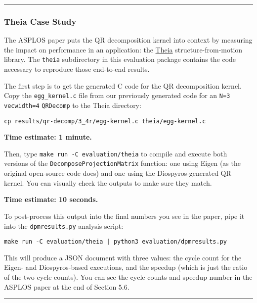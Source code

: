 \begin{center}\rule{0.5\linewidth}{0.5pt}\end{center}

\hypertarget{theia-case-study}{%
\subsubsection{Theia Case Study}\label{theia-case-study}}

The ASPLOS paper puts the QR decomposition kernel into context by
measuring the impact on performance in an application: the
\href{https://github.com/sweeneychris/TheiaSfM}{Theia}
structure-from-motion library. The \texttt{theia} subdirectory in this
evaluation package contains the code necessary to reproduce those
end-to-end results.

The first step is to get the generated C code for the QR decomposition
kernel. Copy the \texttt{egg\_kernel.c} file from our previously
generated code for an \texttt{N=3} \texttt{vecwidth=4} \texttt{QRDecomp}
to the Theia directory:

\begin{verbatim}
cp results/qr-decomp/3_4r/egg-kernel.c theia/egg-kernel.c
\end{verbatim}

\textbf{Time estimate: 1 minute.}

Then, type \texttt{make\ run\ -C\ evaluation/theia} to compile and
execute both versions of the \texttt{DecomposeProjectionMatrix}
function: one using Eigen (as the original open-source code does) and
one using the Diospyros-generated QR kernel. You can visually check the
outputs to make sure they match.

\textbf{Time estimate: 10 seconds.}

To post-process this output into the final numbers you see in the paper,
pipe it into the \texttt{dpmresults.py} analysis script:

\begin{verbatim}
make run -C evaluation/theia | python3 evaluation/dpmresults.py
\end{verbatim}

This will produce a JSON document with three values: the cycle count for
the Eigen- and Diospyros-based executions, and the speedup (which is
just the ratio of the two cycle counts). You can see the cycle counts
and speedup number in the ASPLOS paper at the end of Section 5.6.

\begin{center}\rule{0.5\linewidth}{0.5pt}\end{center}

